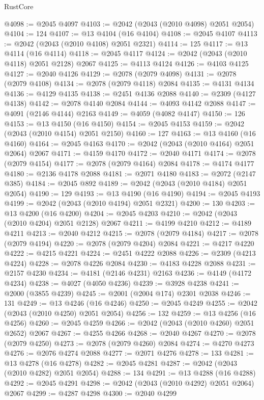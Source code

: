 \begin{lexlean}{RustCore}
\begin{coremodule}
@4098 := @2045 @4097
@4103 := @2042 (@2043 (@2010 @4098) @2051 @2054)
@4104 := 124
@4107 := @13 @4104 (@16 @4104)
@4108 := @2045 @4107
@4113 := @2042 (@2043 (@2010 @4108) @2051 @2321)
@4114 := 125
@4117 := @13 @4114 (@16 @4114)
@4118 := @2045 @4117
@4124 := @2042 (@2043 (@2010 @4118) @2051 @2128) @2067
@4125 := @4113 @4124
@4126 := @4103 @4125
@4127 := @2040 @4126
@4129 := @2078 (@2079 @4098)
@4131 := @2078 (@2079 @4108)
@4134 := @2078 (@2079 @4118) @2084
@4135 := @4131 @4134
@4136 := @4129 @4135
@4138 := @2451 @4136 @2088
@4140 := @2309 (@4127 @4138)
@4142 := @2078 @4140 @2084
@4144 := @4093 @4142 @2088
@4147 := @4091 (@2146 @4144) @2163
@4149 := @4059 (@4082 @4147)
@4150 := 126
@4153 := @13 @4150 (@16 @4150)
@4154 := @2045 @4153
@4159 := @2042 (@2043 (@2010 @4154) @2051 @2150)
@4160 := 127
@4163 := @13 @4160 (@16 @4160)
@4164 := @2045 @4163
@4170 := @2042 (@2043 (@2010 @4164) @2051 @2064) @2067
@4171 := @4159 @4170
@4172 := @2040 @4171
@4174 := @2078 (@2079 @4154)
@4177 := @2078 (@2079 @4164) @2084
@4178 := @4174 @4177
@4180 := @2136 @4178 @2088
@4181 := @2071 @4180
@4183 := @2072 (@2147 @385)
@4184 := @2045 @892
@4189 := @2042 (@2043 (@2010 @4184) @2051 @2054)
@4190 := 129
@4193 := @13 @4190 (@16 @4190)
@4194 := @2045 @4193
@4199 := @2042 (@2043 (@2010 @4194) @2051 @2321)
@4200 := 130
@4203 := @13 @4200 (@16 @4200)
@4204 := @2045 @4203
@4210 := @2042 (@2043 (@2010 @4204) @2051 @2128) @2067
@4211 := @4199 @4210
@4212 := @4189 @4211
@4213 := @2040 @4212
@4215 := @2078 (@2079 @4184)
@4217 := @2078 (@2079 @4194)
@4220 := @2078 (@2079 @4204) @2084
@4221 := @4217 @4220
@4222 := @4215 @4221
@4224 := @2451 @4222 @2088
@4226 := @2309 (@4213 @4224)
@4228 := @2078 @4226 @2084
@4230 := @4183 @4228 @2088
@4231 := @2157 @4230
@4234 := @4181 (@2146 @4231) @2163
@4236 := @4149 (@4172 @4234)
@4238 := @4027 (@4050 @4236)
@4239 := @3928 @4238
@4241 := @2000 (@3855 @4239)
@4245 := @2001 (@2004 @174) @2301 @2038
@4246 := 131
@4249 := @13 @4246 (@16 @4246)
@4250 := @2045 @4249
@4255 := @2042 (@2043 (@2010 @4250) @2051 @2054)
@4256 := 132
@4259 := @13 @4256 (@16 @4256)
@4260 := @2045 @4259
@4266 := @2042 (@2043 (@2010 @4260) @2051 @2652) @2067
@4267 := @4255 @4266
@4268 := @2040 @4267
@4270 := @2078 (@2079 @4250)
@4273 := @2078 (@2079 @4260) @2084
@4274 := @4270 @4273
@4276 := @2076 @4274 @2088
@4277 := @2071 @4276
@4278 := 133
@4281 := @13 @4278 (@16 @4278)
@4282 := @2045 @4281
@4287 := @2042 (@2043 (@2010 @4282) @2051 @2054)
@4288 := 134
@4291 := @13 @4288 (@16 @4288)
@4292 := @2045 @4291
@4298 := @2042 (@2043 (@2010 @4292) @2051 @2064) @2067
@4299 := @4287 @4298
@4300 := @2040 @4299

\end{coremodule}
\end{lexlean}
